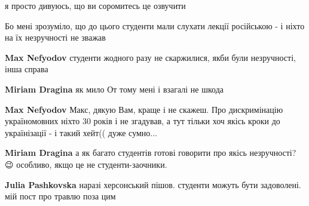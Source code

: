 \begin{itemize}
\begin{itemize}
я просто дивуюсь, що ви соромитесь це озвучити \Smiley[1.0][yellow]

Бо мені зрозуміло, що до цього студенти мали слухати лекції російською - і
ніхто на їх незручності не зважав


 
\textbf{Max Nefyodov} студенти жодного разу не скаржилися, якби були незручності, інша справа

 

\textbf{Miriam Dragina} як мило \Smiley[1.0][yellow]
От тому мені і взагалі не шкода

 
\textbf{Max Nefyodov} Макс, дякую Вам, краще і не скажеш. Про дискримінацію україномовних ніхто 30 років і не згадував, а тут тільки хоч якісь кроки до українізації - і такий хейт(( дуже сумно...

 
\textbf{Miriam Dragina} а як багато студентів готові говорити про якісь незручності? 😉 особливо, якщо це не студенти-заочники.

 
\textbf{Julia Pashkovska} наразі херсонський пішов. студенти можуть бути задоволені. мій пост про травлю поза цим

 

\end{itemize}
\end{itemize}
